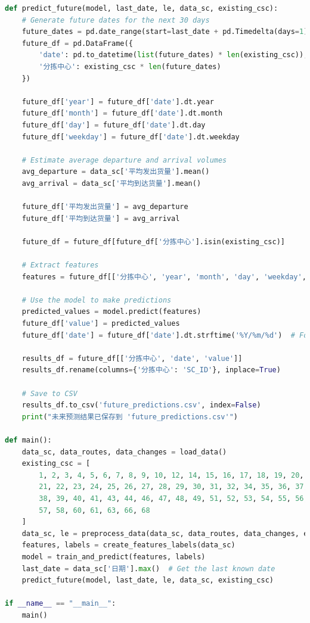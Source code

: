 \documentclass[UTF8,a4paper,10 pt]{article}%
\begin{document}
\begin{lstlisting}[language=python]
def predict_future(model, last_date, le, data_sc, existing_csc):
    # Generate future dates for the next 30 days
    future_dates = pd.date_range(start=last_date + pd.Timedelta(days=1), periods=30)
    future_df = pd.DataFrame({
        'date': pd.to_datetime(list(future_dates) * len(existing_csc)),
        '分拣中心': existing_csc * len(future_dates)
    })
    
    future_df['year'] = future_df['date'].dt.year
    future_df['month'] = future_df['date'].dt.month
    future_df['day'] = future_df['date'].dt.day
    future_df['weekday'] = future_df['date'].dt.weekday

    # Estimate average departure and arrival volumes
    avg_departure = data_sc['平均发出货量'].mean()
    avg_arrival = data_sc['平均到达货量'].mean()

    future_df['平均发出货量'] = avg_departure
    future_df['平均到达货量'] = avg_arrival

    future_df = future_df[future_df['分拣中心'].isin(existing_csc)]

    # Extract features
    features = future_df[['分拣中心', 'year', 'month', 'day', 'weekday', '平均发出货量', '平均到达货量']]
    
    # Use the model to make predictions
    predicted_values = model.predict(features)
    future_df['value'] = predicted_values
    future_df['date'] = future_df['date'].dt.strftime('%Y/%m/%d')  # Format the date

    results_df = future_df[['分拣中心', 'date', 'value']]
    results_df.rename(columns={'分拣中心': 'SC_ID'}, inplace=True)

    # Save to CSV
    results_df.to_csv('future_predictions.csv', index=False)
    print("未来预测结果已保存到 'future_predictions.csv'")

def main():
    data_sc, data_routes, data_changes = load_data()
    existing_csc = [
        1, 2, 3, 4, 5, 6, 7, 8, 9, 10, 12, 14, 15, 16, 17, 18, 19, 20,
        21, 22, 23, 24, 25, 26, 27, 28, 29, 30, 31, 32, 34, 35, 36, 37,
        38, 39, 40, 41, 43, 44, 46, 47, 48, 49, 51, 52, 53, 54, 55, 56,
        57, 58, 60, 61, 63, 66, 68
    ]
    data_sc, le = preprocess_data(data_sc, data_routes, data_changes, existing_csc)
    features, labels = create_features_labels(data_sc)
    model = train_and_predict(features, labels)
    last_date = data_sc['日期'].max()  # Get the last known date
    predict_future(model, last_date, le, data_sc, existing_csc)

if __name__ == "__main__":
    main()
\end{lstlisting}
\end{document}
